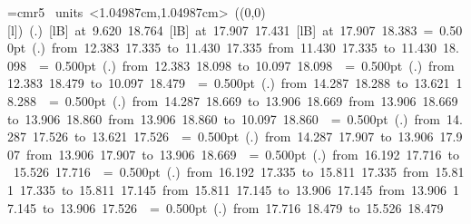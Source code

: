 \font\thinlinefont=cmr5
%
\begingroup\makeatletter\ifx\SetFigFont\undefined%
\gdef\SetFigFont#1#2#3#4#5{%
  \reset@font\fontsize{#1}{#2pt}%
  \fontfamily{#3}\fontseries{#4}\fontshape{#5}%
  \selectfont}%
\fi\endgroup%
\mbox{\beginpicture
\setcoordinatesystem units <1.04987cm,1.04987cm>
\unitlength=1.04987cm
\linethickness=1pt
\setplotsymbol ({\makebox(0,0)[l]{\tencirc{}}})
\setshadesymbol ({\thinlinefont .})
\setlinear
%
%
 [lB] at  9.620 18.764
%
%
 [lB] at  17.907 17.431
%
%
 [lB] at  17.907 18.383
%
%
\linethickness= 0.500pt
\setplotsymbol ({\thinlinefont .})
{\color[rgb]{0,0,0}\putrule from 12.383 17.335 to 11.430 17.335
\putrule from 11.430 17.335 to 11.430 18.098
}%
%
%
\linethickness= 0.500pt
\setplotsymbol ({\thinlinefont .})
{\color[rgb]{0,0,0}\putrule from 12.383 18.098 to 10.097 18.098
}%
%
%
\linethickness= 0.500pt
\setplotsymbol ({\thinlinefont .})
{\color[rgb]{0,0,0}\putrule from 12.383 18.479 to 10.097 18.479
}%
%
%
\linethickness= 0.500pt
\setplotsymbol ({\thinlinefont .})
{\color[rgb]{0,0,0}\putrule from 14.287 18.288 to 13.621 18.288
}%
%
%
\linethickness= 0.500pt
\setplotsymbol ({\thinlinefont .})
{\color[rgb]{0,0,0}\putrule from 14.287 18.669 to 13.906 18.669
\putrule from 13.906 18.669 to 13.906 18.860
\putrule from 13.906 18.860 to 10.097 18.860
}%
%
%
\linethickness= 0.500pt
\setplotsymbol ({\thinlinefont .})
{\color[rgb]{0,0,0}\putrule from 14.287 17.526 to 13.621 17.526
}%
%
%
\linethickness= 0.500pt
\setplotsymbol ({\thinlinefont .})
{\color[rgb]{0,0,0}\putrule from 14.287 17.907 to 13.906 17.907
\putrule from 13.906 17.907 to 13.906 18.669
}%
%
%
\linethickness= 0.500pt
\setplotsymbol ({\thinlinefont .})
{\color[rgb]{0,0,0}\putrule from 16.192 17.716 to 15.526 17.716
}%
%
%
\linethickness= 0.500pt
\setplotsymbol ({\thinlinefont .})
{\color[rgb]{0,0,0}\putrule from 16.192 17.335 to 15.811 17.335
\putrule from 15.811 17.335 to 15.811 17.145
\putrule from 15.811 17.145 to 13.906 17.145
\putrule from 13.906 17.145 to 13.906 17.526
}%
%
%
\linethickness= 0.500pt
\setplotsymbol ({\thinlinefont .})
{\color[rgb]{0,0,0}\putrule from 17.716 18.479 to 15.526 18.479
}}
